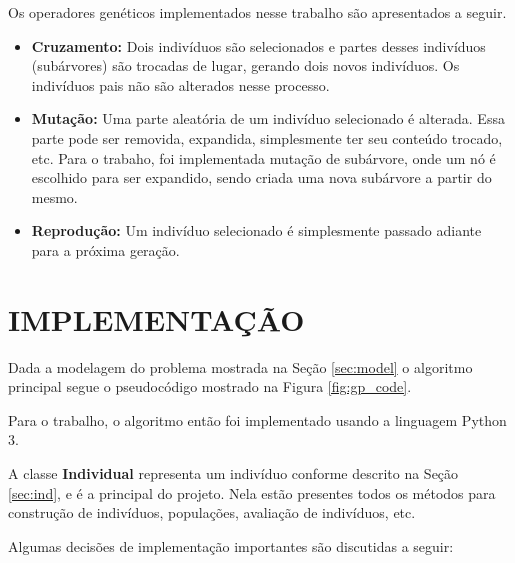 \documentclass[12pt]{article}
\begin{document}
Os operadores genéticos implementados nesse trabalho são apresentados a seguir.

\begin{itemize}
 \item \textbf{Cruzamento:} Dois indivíduos são selecionados e partes desses indivíduos
 (subárvores) são trocadas de lugar, gerando dois novos indivíduos. Os indivíduos pais
 não são alterados nesse processo.
 
 \item \textbf{Mutação:} Uma parte aleatória de um indivíduo selecionado é alterada.
 Essa parte pode ser removida, expandida, simplesmente ter seu conteúdo trocado, etc.
 Para o trabaho, foi implementada mutação de subárvore, onde um nó é escolhido para
 ser expandido, sendo criada uma nova subárvore a partir do mesmo.
 
 \item \textbf{Reprodução:} Um indivíduo selecionado é simplesmente passado adiante para
 a próxima geração.
\end{itemize}


\section{IMPLEMENTAÇÃO}

Dada a modelagem do problema mostrada na Seção \ref{sec:model} o algoritmo principal
segue o pseudocódigo mostrado na Figura \ref{fig:gp_code}.

Para o trabalho, o algoritmo então foi implementado usando a linguagem Python 3.

A classe \textbf{Individual} representa um indivíduo conforme descrito na Seção
\ref{sec:ind}, e é a principal do projeto. Nela estão presentes todos os métodos 
para construção de indivíduos, populações, avaliação de indivíduos, etc.

Algumas decisões de implementação importantes são discutidas a seguir:
\end{document}
